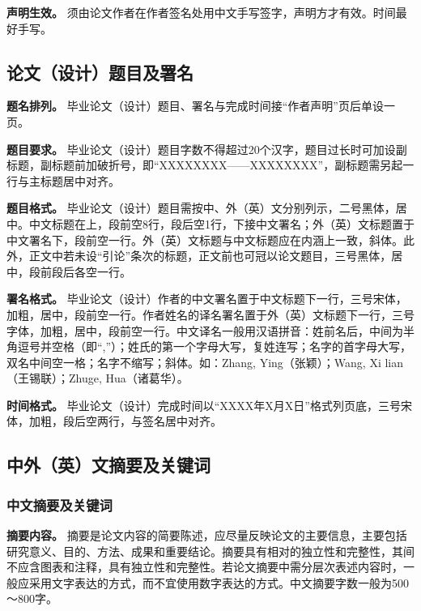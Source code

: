 \documentclass[doublesided]{Style/ucasthesis}%
\begin{document}
\textbf{声明生效。} 须由论文作者在作者签名处用中文手写签字，声明方才有效。时间最好手写。

\hypertarget{section-13}{%
\subsection{论文（设计）题目及署名}\label{section-13}}

\textbf{题名排列。} 毕业论文（设计）题目、署名与完成时间接``作者声明''页后单设一页。

\textbf{题目要求。} 毕业论文（设计）题目字数不得超过20个汉字，题目过长时可加设副标题，副标题前加破折号，即``XXXXXXXX------XXXXXXXX''，副标题需另起一行与主标题居中对齐。

\textbf{题目格式。} 毕业论文（设计）题目需按中、外（英）文分别列示，二号黑体，居中。中文标题在上，段前空8行，段后空1行，下接中文署名；外（英）文标题置于中文署名下，段前空一行。外（英）文标题与中文标题应在内涵上一致，斜体。此外，正文中若未设``引论''条次的标题，正文前也可冠以论文题目，三号黑体，居中，段前段后各空一行。

\textbf{署名格式。} 毕业论文（设计）作者的中文署名置于中文标题下一行，三号宋体，加粗，居中，段前空一行。作者姓名的译名署名置于外（英）文标题下一行，三号字体，加粗，居中，段前空一行。中文译名一般用汉语拼音：姓前名后，中间为半角逗号并空格（即``,''）；姓氏的第一个字母大写，复姓连写；名字的首字母大写，双名中间空一格；名字不缩写；斜体。如：Zhang, Ying（张颖）；Wang, Xi lian（王锡联）；Zhuge, Hua（诸葛华）。

\textbf{时间格式。} 毕业论文（设计）完成时间以``XXXX年X月X日''格式列页底，三号宋体，加粗，段后空两行，与签名居中对齐。

\hypertarget{section-14}{%
\subsection{中外（英）文摘要及关键词}\label{section-14}}

\hypertarget{section-15}{%
\subsubsection{中文摘要及关键词}\label{section-15}}

\textbf{摘要内容。} 摘要是论文内容的简要陈述，应尽量反映论文的主要信息，主要包括研究意义、目的、方法、成果和重要结论。摘要具有相对的独立性和完整性，其间不应含图表和注释，具有独立性和完整性。若论文摘要中需分层次表述内容时，一般应采用文字表达的方式，而不宜使用数字表达的方式。中文摘要字数一般为500～800字。
\end{document}
